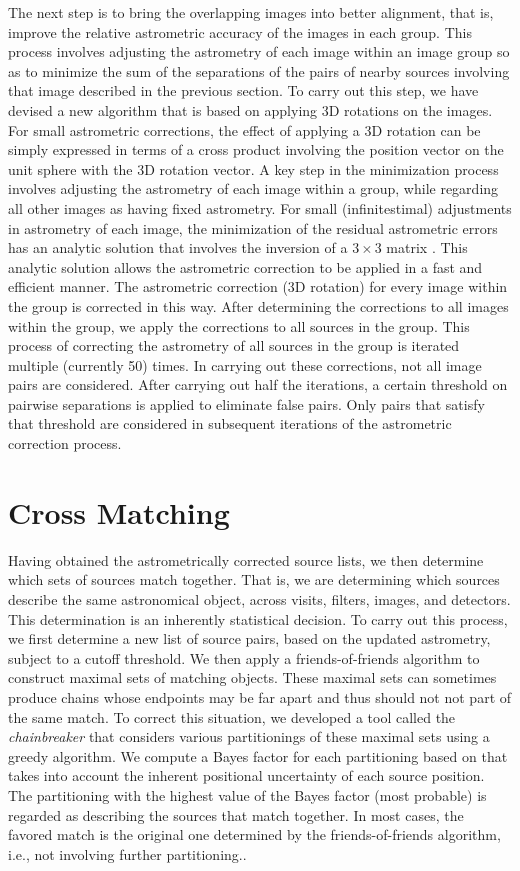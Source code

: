 The next step is to bring the overlapping images into better alignment, that is,
improve the relative astrometric accuracy of the images in each group.
This process involves adjusting the astrometry of each
image within an image group so as to  minimize the sum of the separations of the
pairs of nearby sources involving that image described in the previous section.
To carry out this step, we have devised a new algorithm that is based
on applying 3D rotations on the images. 
For small astrometric corrections,
the effect of applying a 3D rotation can be simply expressed in terms
of a cross product involving the position vector on the unit sphere
with the 3D rotation vector. A key step in the minimization process involves adjusting
the astrometry of
each image within a group, while regarding all other images as having fixed astrometry.
For small (infinitestimal) adjustments in astrometry of each image, the minimization of the residual astrometric errors
has an analytic solution
that involves the inversion of a $3 \times 3$ matrix \cite{2012arXiv1206.0644B}. This analytic solution allows the astrometric correction to be applied
 in a fast and efficient manner. The astrometric correction (3D rotation)
for every image within the group is corrected in this way. After determining the corrections
to all images within the group, we apply the corrections  to all
sources in the group. This process of correcting the astrometry of all sources in the group
is iterated multiple (currently 50) times.
In carrying out these corrections, not all image pairs are considered. After carrying out
half the iterations, a certain threshold on pairwise separations 
is applied
to eliminate false pairs. Only pairs that satisfy that threshold are considered in  subsequent
iterations of the astrometric correction process.

\section{Cross Matching}
Having obtained the astrometrically corrected source lists, we then determine which
sets of sources match together. That is, we are determining which sources describe
the same astronomical object, across visits, filters, images, and detectors. 
This determination is an inherently statistical decision.
To carry out this process, we first determine a new list of source pairs, based on 
the updated astrometry, subject to a cutoff threshold. 
We then apply 
a friends-of-friends algorithm to construct maximal sets of matching objects.
These maximal sets can sometimes produce chains whose endpoints
may be far apart and thus should not not part of the same match. To correct this situation,
we developed a tool called the {\it chainbreaker} that considers various partitionings
of these maximal sets using a greedy algorithm. We
compute a Bayes factor for each partitioning based on \cite{2008ApJ...679..301B} that takes into account
the inherent positional uncertainty of each source position. The partitioning with
the highest value of the Bayes factor (most probable) is regarded as describing the sources
that match together. In most cases, the favored match is the original one determined
by the friends-of-friends algorithm, i.e., not involving further partitioning.. 

